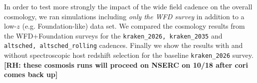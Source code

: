 In order to test more strongly the impact of the wide field cadence on the overall cosmology, we ran simulations including \textit{only the WFD survey} in addition to a low-$z$ (e.g. Foundation-like) data set. We compared the cosmology results from the WFD+Foundation surveys for the {\tt kraken\_2026, kraken\_2035} and {\tt altsched, altsched\_rolling} cadences. Finally we show the results with and without spectroscopic host redshift selection for the baseline {\tt kraken\_2026} survey. \textbf{[RH: these cosmosis runs will proceed on NSERC on 10/18 after cori comes back up]}


